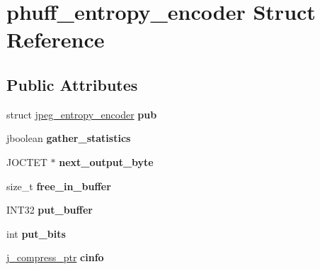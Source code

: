 \hypertarget{structphuff__entropy__encoder}{}\section{phuff\+\_\+entropy\+\_\+encoder Struct Reference}
\label{structphuff__entropy__encoder}
\subsection*{Public Attributes}
\begin{DoxyCompactItemize}
\item 
struct \hyperlink{structjpeg__entropy__encoder}{jpeg\+\_\+entropy\+\_\+encoder} {\bfseries pub}\hypertarget{structphuff__entropy__encoder_ad8d129d146fd832d4f1fc57d169c5b6f}{}\label{structphuff__entropy__encoder_ad8d129d146fd832d4f1fc57d169c5b6f}

\item 
jboolean {\bfseries gather\+\_\+statistics}\hypertarget{structphuff__entropy__encoder_a19452741884c8e5bf3c91f6b039ed754}{}\label{structphuff__entropy__encoder_a19452741884c8e5bf3c91f6b039ed754}

\item 
J\+O\+C\+T\+ET $\ast$ {\bfseries next\+\_\+output\+\_\+byte}\hypertarget{structphuff__entropy__encoder_aa430c79495bcb73210d50504e45383bd}{}\label{structphuff__entropy__encoder_aa430c79495bcb73210d50504e45383bd}

\item 
size\+\_\+t {\bfseries free\+\_\+in\+\_\+buffer}\hypertarget{structphuff__entropy__encoder_a6409c77f6b52c1d1be6289cb62f8ed6c}{}\label{structphuff__entropy__encoder_a6409c77f6b52c1d1be6289cb62f8ed6c}

\item 
I\+N\+T32 {\bfseries put\+\_\+buffer}\hypertarget{structphuff__entropy__encoder_a1a45fd2e8e369b6a17a80066b2f453d7}{}\label{structphuff__entropy__encoder_a1a45fd2e8e369b6a17a80066b2f453d7}

\item 
int {\bfseries put\+\_\+bits}\hypertarget{structphuff__entropy__encoder_a5b5a3bfaa7fc8d9b08f5a91085fc638a}{}\label{structphuff__entropy__encoder_a5b5a3bfaa7fc8d9b08f5a91085fc638a}

\item 
\hyperlink{structjpeg__compress__struct}{j\+\_\+compress\+\_\+ptr} {\bfseries cinfo}\hypertarget{structphuff__entropy__encoder_a724db7eea7ecc83675fef17357b9830d}{}\label{structphuff__entropy__encoder_a724db7eea7ecc83675fef17357b9830d}


\end{DoxyCompactItemize}

